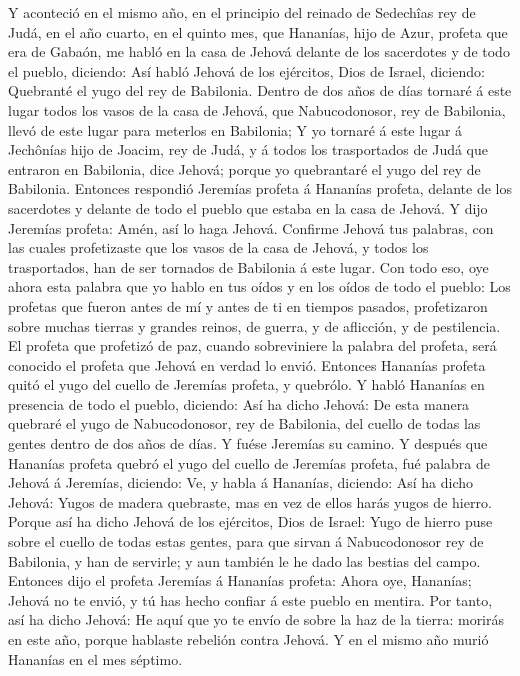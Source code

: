  Y aconteció en el mismo año, en el principio del reinado
de Sedechîas rey de Judá, en el año cuarto, en el quinto mes, que
Hananías, hijo de Azur, profeta que era de Gabaón, me habló en la casa
de Jehová delante de los sacerdotes y de todo el pueblo, diciendo:
 Así habló Jehová de los ejércitos, Dios de Israel,
diciendo: Quebranté el yugo del rey de Babilonia.  Dentro
de dos años de días tornaré á este lugar todos los vasos de la casa de
Jehová, que Nabucodonosor, rey de Babilonia, llevó de este lugar para
meterlos en Babilonia;  Y yo tornaré á este lugar á
Jechônías hijo de Joacim, rey de Judá, y á todos los trasportados de
Judá que entraron en Babilonia, dice Jehová; porque yo quebrantaré el
yugo del rey de Babilonia.  Entonces respondió Jeremías
profeta á Hananías profeta, delante de los sacerdotes y delante de todo
el pueblo que estaba en la casa de Jehová.  Y dijo
Jeremías profeta: Amén, así lo haga Jehová. Confirme Jehová tus
palabras, con las cuales profetizaste que los vasos de la casa de
Jehová, y todos los trasportados, han de ser tornados de Babilonia á
este lugar.  Con todo eso, oye ahora esta palabra que yo
hablo en tus oídos y en los oídos de todo el pueblo:  Los
profetas que fueron antes de mí y antes de ti en tiempos pasados,
profetizaron sobre muchas tierras y grandes reinos, de guerra, y de
aflicción, y de pestilencia.  El profeta que profetizó de
paz, cuando sobreviniere la palabra del profeta, será conocido el
profeta que Jehová en verdad lo envió.  Entonces Hananías
profeta quitó el yugo del cuello de Jeremías profeta, y quebrólo.
 Y habló Hananías en presencia de todo el pueblo,
diciendo: Así ha dicho Jehová: De esta manera quebraré el yugo de
Nabucodonosor, rey de Babilonia, del cuello de todas las gentes dentro
de dos años de días. Y fuése Jeremías su camino.  Y
después que Hananías profeta quebró el yugo del cuello de Jeremías
profeta, fué palabra de Jehová á Jeremías, diciendo:  Ve,
y habla á Hananías, diciendo: Así ha dicho Jehová: Yugos de madera
quebraste, mas en vez de ellos harás yugos de hierro. 
Porque así ha dicho Jehová de los ejércitos, Dios de Israel: Yugo de
hierro puse sobre el cuello de todas estas gentes, para que sirvan á
Nabucodonosor rey de Babilonia, y han de servirle; y aun también le he
dado las bestias del campo.  Entonces dijo el profeta
Jeremías á Hananías profeta: Ahora oye, Hananías; Jehová no te envió, y
tú has hecho confiar á este pueblo en mentira.  Por
tanto, así ha dicho Jehová: He aquí que yo te envío de sobre la haz de
la tierra: morirás en este año, porque hablaste rebelión contra Jehová.
 Y en el mismo año murió Hananías en el mes séptimo.

